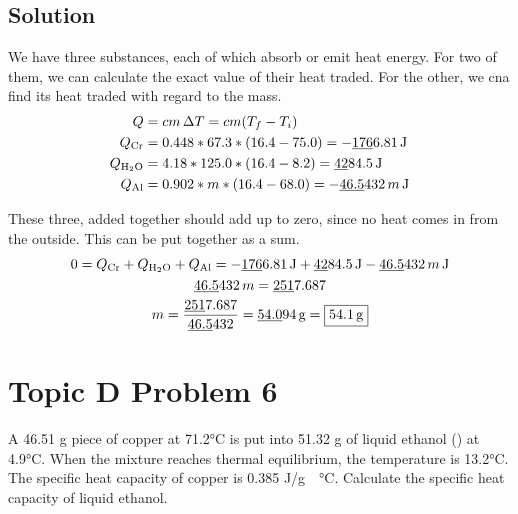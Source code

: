 \documentclass[10pt]{article}
\newcommand{\U}[1]{\underline{#1}}
\begin{document}
        \subsection{Solution}
            We have three substances, each of which absorb or emit heat energy.
            For two of them, we can calculate the exact value of their heat traded.
            For the other, we cna find its heat traded with regard to the mass.
            \begin{align}
                Q   &=  cm\,\Delta T
                    =   cm(T_f - T_i)\\
                Q_{\rm Cr}  &=  0.448 * 67.3 * (16.4 - 75.0)
                    =   -\U{176}6.81\,\unit{\joule}\\
                Q_{\rm H_2O}    &=  4.18 * 125.0 * (16.4 - 8.2)
                    =   \U{42}84.5\,\unit{\joule}\\
                Q_{\rm Al}  &=  0.902 * m * (16.4 - 68.0)
                    =   -\U{46.5}432\,m\,\unit{\joule}
            \end{align}

            These three, added together should add up to zero, since no heat comes in from the outside.
            This can be put together as a sum.
            \begin{gather}
                0   =   Q_{\rm Cr} + Q_{\rm H_2O} + Q_{\rm Al}
                    =   -\U{176}6.81\,\unit{\joule} + \U{42}84.5\,\unit{\joule} - \U{46.5}432\,m\,\unit{\joule}\\
                \U{46.5}432\,m  =   \U{251}7.687\\
                m   =   \frac{\U{251}7.687}{\U{46.5}432}
                    =   \U{54.0}94\,\unit{\gram}
                    =   \boxed{54.1\,\unit{\gram}}
            \end{gather}

    \pagebreak
    \section{Topic D Problem 6}
        A 46.51 g piece of copper at 71.2\unit{\celsius} is put into 51.32 g of liquid ethanol () at 4.9\unit{\celsius}.
        When the mixture reaches thermal equilibrium, the temperature is 13.2\unit{\celsius}. 
        The specific heat capacity of copper is 0.385 \unit{\joule/\gram\cdot\celsius}. 
        Calculate the specific heat capacity of liquid ethanol.
\end{document}
